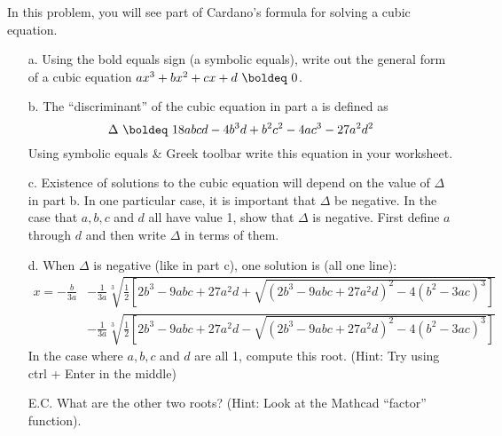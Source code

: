 {In this problem, you will see part of Cardano's formula for solving a cubic equation.
\begin{enumerate}
\item[a.] Using the bold equals sign (a symbolic equals), write out the general form of a cubic equation $a x^3 + bx^2 + cx +d\ \boldeq \ 0$.
\item[b.] The ``discriminant'' of the cubic equation in part a is defined as \[\Delta \ \boldeq \ 18abcd - 4b^3d + b^2c^2 -4ac^3-27a^2d^2\] Using symbolic equals 
\& Greek toolbar write this equation in your worksheet. 
\item[c.] Existence of solutions to the cubic equation will depend on the value of $\Delta$ in part b.  In one particular case, it is important that $\Delta$ be negative. In the case that $a,b,c$ and $d$ all have value 1, show that $\Delta$ is negative.  First define $a$ through $d$ and then write $\Delta$ in terms of them.   
\item[d.] When $\Delta$ is negative (like in part c), one solution is (all one line): 
\begin{align*}
x=-\frac{b}{3a}
&-\frac{1}{3a}\sqrt[3]{\frac{1}{2}\left[2b^3-9abc+27a^2d+\sqrt{(2b^3-9abc+27a^2d)^2-4(b^2-3ac)^3} \right]}\\
&-\frac{1}{3a}\sqrt[3]{\frac{1}{2}\left[2b^3-9abc+27a^2d-\sqrt{(2b^3-9abc+27a^2d)^2-4(b^2-3ac)^3} \right]}
\end{align*}
In the case where $a,b,c$ and $d$ are all 1, compute this root. (Hint: Try using ctrl + Enter in the middle)
\item[E.C.] What are the other two roots?  (Hint: Look at the Mathcad ``factor'' function).
\end{enumerate}
}
{}